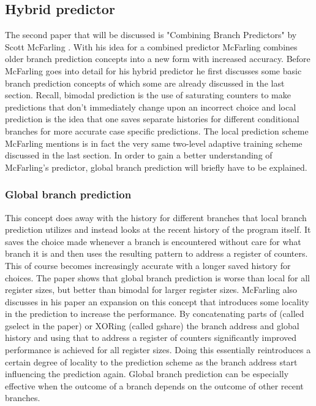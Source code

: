 \subsection{Hybrid predictor}
\label{sec:hybrid}
The second paper that will be discussed is "Combining Branch Predictors" by Scott McFarling \cite{hybrid}.
With his idea for a combined predictor McFarling combines older branch prediction concepts into a new form with increased accuracy.
Before McFarling goes into detail for his hybrid predictor he first discusses some basic branch prediction concepts of which some are already discussed in the last section.
Recall, bimodal prediction is the use of saturating counters to make predictions that don't immediately change upon an incorrect choice and local prediction is the idea that one saves separate histories for different conditional branches for more accurate case specific predictions.
The local prediction scheme McFarling mentions is in fact the very same two-level adaptive training scheme discussed in the last section.
In order to gain a better understanding of McFarling's predictor, global branch prediction will briefly have to be explained.
\subsubsection{Global branch prediction}
This concept does away with the history for different branches that local branch prediction utilizes and instead looks at the recent history of the program itself.
It saves the choice made whenever a branch is encountered without care for what branch it is and then uses the resulting pattern to address a register of counters.
This of course becomes increasingly accurate with a longer saved history for choices.
The paper shows that global branch prediction is worse than local for all register sizes, but better than bimodal for larger register sizes.
McFarling also discusses in his paper an expansion on this concept that introduces some locality in the prediction to increase the performance.
By concatenating parts of (called gselect in the paper) or XORing (called gshare) the branch address and global history and using that to address a register of counters significantly improved performance is achieved for all register sizes.
Doing this essentially reintroduces a certain degree of locality to the prediction scheme as the branch address start influencing the prediction again.
Global branch prediction can be especially effective when the outcome of a branch depends on the outcome of other recent branches.
